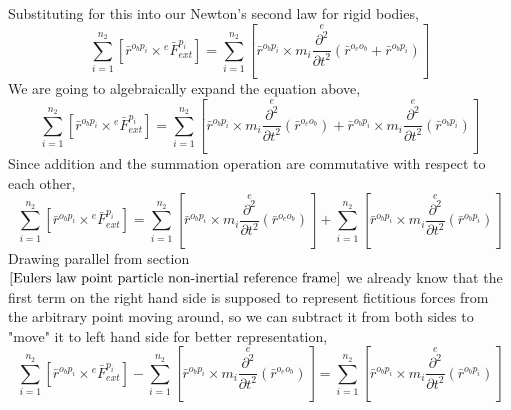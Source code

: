 Substituting for this into our Newton's second law for rigid bodies,
$$\sum^{n_{2}}_{i = 1}\left[\bar{r}^{o_{b}p_{i}}\times{}^{e}\bar{F}^{p_{i}}_{ext}\right] = \sum^{n_{2}}_{i = 1}\left[\bar{r}^{o_{b}p_{i}}\times m_{i}\overset{e}{\frac{\partial^{2}}{\partial t^{2}}}(\bar{r}^{o_{e}o_{b}} + \bar{r}^{o_{b}p_{i}})\right]$$
We are going to algebraically expand the equation above,
$$\sum^{n_{2}}_{i = 1}\left[\bar{r}^{o_{b}p_{i}}\times{}^{e}\bar{F}^{p_{i}}_{ext}\right] = \sum^{n_{2}}_{i = 1}\left[\bar{r}^{o_{b}p_{i}}\times m_{i}\overset{e}{\frac{\partial^{2}}{\partial t^{2}}}(\bar{r}^{o_{e}o_{b}}) + \bar{r}^{o_{b}p_{i}}\times m_{i}\overset{e}{\frac{\partial^{2}}{\partial t^{2}}}(\bar{r}^{o_{b}p_{i}})\right]$$
Since addition and the summation operation are commutative with respect to each other,
$$\sum^{n_{2}}_{i = 1}\left[\bar{r}^{o_{b}p_{i}}\times{}^{e}\bar{F}^{p_{i}}_{ext}\right] = 
\sum^{n_{2}}_{i = 1}\left[\bar{r}^{o_{b}p_{i}}\times m_{i}\overset{e}{\frac{\partial^{2}}{\partial t^{2}}}(\bar{r}^{o_{e}o_{b}})\right] + \sum^{n_{2}}_{i = 1}\left[\bar{r}^{o_{b}p_{i}}\times m_{i}\overset{e}{\frac{\partial^{2}}{\partial t^{2}}}(\bar{r}^{o_{b}p_{i}})\right]$$
Drawing parallel from section $\ref{Eulers law point particle non-inertial reference frame}$ we already know that the first term on the right hand side is supposed to represent fictitious forces from the arbitrary point moving around, so we can subtract it from both sides to "move" it to left hand side for better representation,
\begin{equation}\sum^{n_{2}}_{i = 1}\left[\bar{r}^{o_{b}p_{i}}\times{}^{e}\bar{F}^{p_{i}}_{ext}\right] - \sum^{n_{2}}_{i = 1}\left[\bar{r}^{o_{b}p_{i}}\times m_{i}\overset{e}{\frac{\partial^{2}}{\partial t^{2}}}(\bar{r}^{o_{e}o_{b}})\right]
 = \sum^{n_{2}}_{i = 1}\left[\bar{r}^{o_{b}p_{i}}\times m_{i}\overset{e}{\frac{\partial^{2}}{\partial t^{2}}}(\bar{r}^{o_{b}p_{i}})\right] \label{Eulers Law Rigid Body Non Inertial Primitive 1}\end{equation}

